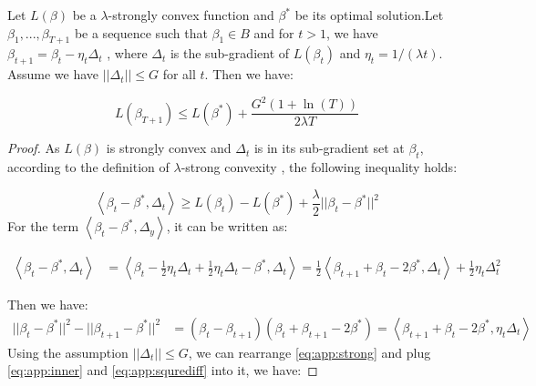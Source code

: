 \begin{theorem}\label{th:1}
Let $L(\beta)$ be a $\lambda$-strongly convex function and $\beta^*$ be its optimal solution.Let $\beta_1,...,\beta_{T+1}$ be a sequence such that $\beta_1 \in B$ and for $t>1$, we have $\beta_{t+1} = \beta_t - \eta_t \Delta_t$ , where $\Delta_t$ is the sub-gradient of $L(\beta_t)$ and $\eta_t = 1/(\lambda t)$. Assume we have $||\Delta_t|| \leq G$ for all $t$. Then we have:
	
	\begin{equation}
	L(\beta_{T+1}) \leq L(\beta^*)+\frac{G^2(1+\ln (T))}{2\lambda T}
	\end{equation}
\end{theorem}

\begin{proof}
	As $L(\beta)$ is strongly convex and $\Delta_t$ is in its sub-gradient set at $\beta_t$, according to the definition of $\lambda$-strong convexity \cite{rockafellar2015convex}, the following inequality holds:
	
	\begin{equation}\label{eq:app:strong}
		\left\langle {\beta_t - \beta^*,\Delta_t} \right\rangle \geq L(\beta_t)-L(\beta^*)+\frac{\lambda}{2}||\beta_t - \beta^*||^2
	\end{equation} 
	For the term $\left\langle {\beta_t - \beta^*,\Delta_y} \right\rangle$, it can be written as:
	
	\begin{equation} \label{eq:app:inner}
	\begin{aligned}
	\left\langle {\beta_t - \beta^*,\Delta_t} \right\rangle &= \left\langle {\beta_t - \frac{1}{2}\eta_t\Delta_t + \frac{1}{2}\eta_t\Delta_t- \beta^*,\Delta_t} \right\rangle
	=\frac{1}{2}\left\langle {{\beta _{t + 1}} + {\beta _t} - 2{\beta ^*},{\Delta _t}} \right\rangle  + \frac{1}{2}{\eta _t}\Delta _t^2
	\end{aligned}
	\end{equation}
	
	Then we have:
	\begin{equation}\label{eq:app:squrediff}
	\begin{aligned}
	||\beta_t-\beta^*||^2-||\beta_{t+1}-\beta^*||^2 &= ( {{\beta _t} - {\beta _{t + 1}}})  ({{\beta _t} + {\beta _{t + 1}} - 2{\beta ^*}}) 
	=\left\langle {{\beta _{t + 1}} + {\beta _t} - 2{\beta ^*},{\eta_t\Delta _t}} \right\rangle
	\end{aligned}
	\end{equation}
	Using the assumption $||\Delta_t|| \leq G$, we can rearrange \eqref{eq:app:strong} and plug \eqref{eq:app:inner} and \eqref{eq:app:squrediff} into it, we have:
	

\end{proof}
